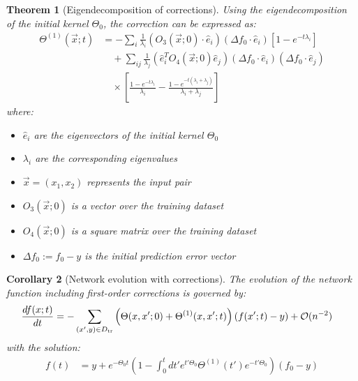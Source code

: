 \documentclass[11pt,a4paper]{article}
\newtheorem{theorem}{Theorem}[section]
\newtheorem{corollary}[theorem]{Corollary}
\theoremstyle{definition}
\begin{document}
\begin{theorem}[Eigendecomposition of corrections]\label{thm:eigen_corrections}
Using the eigendecomposition of the initial kernel $\Theta_0$, the correction can be expressed as:
\begin{align}
\Theta^{(1)}(\vec{x};t) &= -\sum_{i}\frac{1}{\lambda_{i}}(O_{3}(\vec{x};0)\cdot\hat{e}_{i})(\Delta f_{0}\cdot\hat{e}_{i})\left[1-e^{-t\lambda_{i}}\right] \nonumber\\
&\quad +\sum_{ij}\frac{1}{\lambda_{j}}(\hat{e}_{i}^{T}O_{4}(\vec{x};0)\hat{e}_{j})(\Delta f_{0}\cdot \hat{e}_{i})(\Delta f_{0}\cdot \hat{e}_{j}) \nonumber\\
&\quad \times \left[\frac{1-e^{-t\lambda_{i}}}{\lambda_{i}}-\frac{1-e^{-t(\lambda_{i}+\lambda_{j})}}{\lambda_{i}+\lambda_{j}}\right] \label{eq:eigen_expansion}
\end{align}
where:
\begin{itemize}
\item $\hat{e}_{i}$ are the eigenvectors of the initial kernel $\Theta_{0}$
\item $\lambda_{i}$ are the corresponding eigenvalues
\item $\vec{x} = (x_1,x_2)$ represents the input pair
\item $O_{3}(\vec{x};0)$ is a vector over the training dataset
\item $O_{4}(\vec{x};0)$ is a square matrix over the training dataset
\item $\Delta f_{0} := f_{0} - y$ is the initial prediction error vector
\end{itemize}
\end{theorem}

\begin{corollary}[Network evolution with corrections]\label{cor:network_evolution}
The evolution of the network function including first-order corrections is governed by:
\begin{align}
\frac{df(x;t)}{dt} &= -\sum_{(x',y)\in D_{\rm tr}}\left(\Theta(x,x';0)+\Theta^{(1)}(x,x';t)\right)\left(f(x';t)-y\right) + \mathcal{O}(n^{-2}) \label{eq:evolution_ode}
\end{align}
with the solution:
\begin{align}
f(t) &= y + e^{-\Theta_{0}t}\left(1-\int_{0}^{t}dt'e^{t'\Theta_{0}}\Theta^{(1)}(t')e^{-t'\Theta_{0}}\right)\left(f_{0}-y\right) \label{eq:evolution_solution}
\end{align}
\end{corollary}
\end{document}
